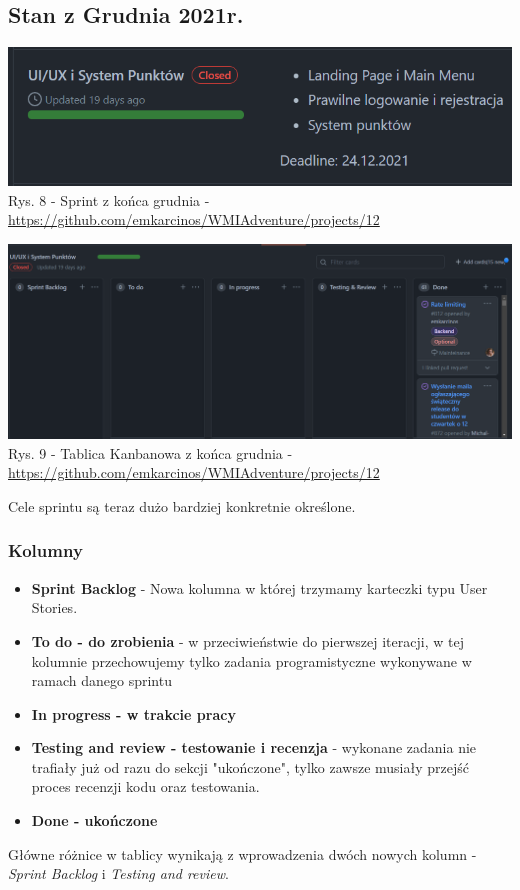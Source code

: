 \documentclass{article}
\begin{document}
\subsection*{Stan z Grudnia 2021r.}
\begin{center}
    \includegraphics[scale=0.6]{latest_sprint.png}
    \newline
    Rys. 8 - Sprint z końca grudnia - \url{https://github.com/emkarcinos/WMIAdventure/projects/12}

\end{center}\begin{center}
    \includegraphics[scale=0.275]{latest_kanban.png}
    \newline
    Rys. 9 - Tablica Kanbanowa z końca grudnia - \url{https://github.com/emkarcinos/WMIAdventure/projects/12}
\end{center}

Cele sprintu są teraz dużo bardziej konkretnie określone.

\subsubsection*{Kolumny}
\begin{itemize}
    \item \textbf{Sprint Backlog} - Nowa kolumna w której trzymamy karteczki typu User Stories.
    \item \textbf{To do - do zrobienia} - w przeciwieństwie do pierwszej iteracji, w tej kolumnie przechowujemy tylko zadania programistyczne wykonywane w ramach danego sprintu
    \item \textbf{In progress - w trakcie pracy}
    \item \textbf{Testing and review - testowanie i recenzja} - wykonane zadania nie trafiały już od razu do sekcji "ukończone", tylko zawsze musiały przejść proces recenzji kodu oraz testowania.
    \item \textbf{Done - ukończone}
\end{itemize}
Główne różnice w tablicy wynikają z wprowadzenia dwóch nowych kolumn - \textit{Sprint Backlog} i \textit{Testing and review}.
\end{document}

